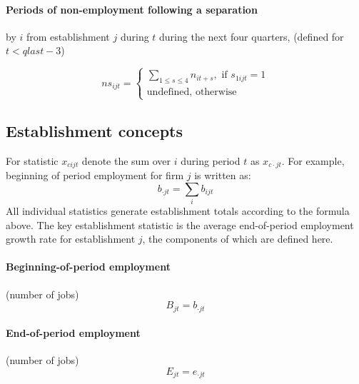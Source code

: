 \paragraph{Periods of non-employment following a separation}

by $i$ from establishment $j$ during $t$ during the next four quarters,
(defined for $t<qlast-3$)

\begin{equation}
ns_{ijt} = \left\{ 
\begin{array}{l}
{\sum\limits_{1 \leqslant s \leqslant 4} {n_{it + s} } ,\mbox{ if }s_{1ijt}
= 1} \\ 
{\mbox{undefined,
otherwise}}%
\end{array}%
\right.
\end{equation}

\subsection{Establishment concepts}

\label{sec:technical:employer}

For statistic $x_{cijt}$ denote the sum over $i$ during period $t$ as $%
x_{c\cdot jt}$. For example, beginning of period employment for firm $j$ is
written as:%
\begin{equation}
b_{\cdot jt}=\sum\limits_{i}b_{ijt}
\end{equation}%
All individual statistics generate establishment totals according to the
formula above. The key establishment statistic is the average end-of-period
employment growth rate for establishment $j$, the components of which are
defined here.

\paragraph{Beginning-of-period employment}

(number of jobs)%
\begin{equation}
B_{jt}=b_{\cdot jt}
\end{equation}

\paragraph{End-of-period employment}

(number of jobs)%
\begin{equation}
E_{jt}=e_{\cdot jt}
\end{equation}

